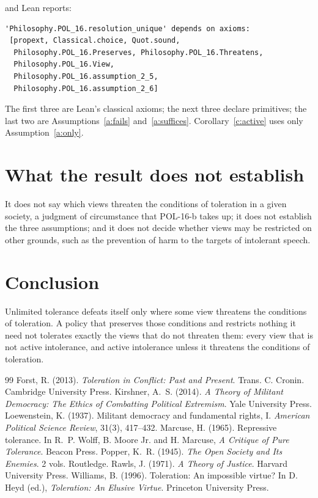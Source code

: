 \documentclass{situationist-preprint}
\begin{document}
\noindent and Lean reports:

\begin{lstlisting}
'Philosophy.POL_16.resolution_unique' depends on axioms:
 [propext, Classical.choice, Quot.sound,
  Philosophy.POL_16.Preserves, Philosophy.POL_16.Threatens,
  Philosophy.POL_16.View,
  Philosophy.POL_16.assumption_2_5,
  Philosophy.POL_16.assumption_2_6]
\end{lstlisting}

The first three are Lean's classical axioms; the next three declare primitives; the last two are Assumptions~\ref{a:fails} and~\ref{a:suffices}. Corollary~\ref{c:active} uses only Assumption~\ref{a:only}.

\section{What the result does not establish}

It does not say which views threaten the conditions of toleration in a given society, a judgment of circumstance that POL-16-b takes up; it does not establish the three assumptions; and it does not decide whether views may be restricted on other grounds, such as the prevention of harm to the targets of intolerant speech.

\section{Conclusion}

Unlimited tolerance defeats itself only where some view threatens the conditions of toleration. A policy that preserves those conditions and restricts nothing it need not tolerates exactly the views that do not threaten them: every view that is not active intolerance, and active intolerance unless it threatens the conditions of toleration.

\begin{thebibliography}{99}\small
{} Forst, R. (2013). \emph{Toleration in Conflict: Past and Present}. Trans. C. Cronin. Cambridge University Press.
 Kirshner, A.~S. (2014). \emph{A Theory of Militant Democracy: The Ethics of Combatting Political Extremism}. Yale University Press.
 Loewenstein, K. (1937). Militant democracy and fundamental rights, I. \emph{American Political Science Review}, 31(3), 417--432.
 Marcuse, H. (1965). Repressive tolerance. In R.~P. Wolff, B. Moore Jr. and H. Marcuse, \emph{A Critique of Pure Tolerance}. Beacon Press.
 Popper, K.~R. (1945). \emph{The Open Society and Its Enemies}. 2 vols. Routledge.
 Rawls, J. (1971). \emph{A Theory of Justice}. Harvard University Press.
 Williams, B. (1996). Toleration: An impossible virtue? In D. Heyd (ed.), \emph{Toleration: An Elusive Virtue}. Princeton University Press.
\end{thebibliography}
\end{document}
